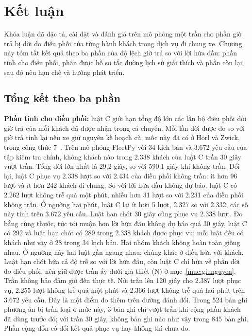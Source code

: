 \chapter{Kết luận}
\label{chuong:ketluan}

Khóa luận đã đặc tả, cài đặt và đánh giá trên mô phỏng một trần cho phần giờ trả bị dời do điều phối của từng hành khách trong dịch vụ đi chung xe. Chương này tóm tắt kết quả theo ba phần của độ lệch giờ trả so với lời hứa đầu: phần tính cho điều phối, phần được hồ sơ tắc đường lịch sử giải thích và phần còn lại; sau đó nêu hạn chế và hướng phát triển.

\section{Tổng kết theo ba phần}
\label{muc:c5-tongket}

\textbf{Phần tính cho điều phối:} luật C giới hạn tổng độ lớn các lần bộ điều phối dời giờ trả của mỗi khách đã được nhận trong cả chuyến. Mỗi lần dời được đo so với giờ trả tính lại nếu xe giữ nguyên kế hoạch cũ; mốc này đã có ở Hörl và Zwick, trong công thức 7~\cite{horl2022}. Trên mô phỏng FleetPy với 34 kịch bản và 3.672 yêu cầu của tập kiểm tra chính, không khách nào trong 2.338 khách của luật C trần 30 giây vượt trần. Tổng dời lớn nhất là 29,2 giây, so với 590,1 giây khi không trần. Đổi lại, luật C phục vụ 2.338 lượt so với 2.434 của điều phối không trần: ít hơn 96 lượt và ít hơn 242 khách đi chung. So với lời hứa đầu không dự báo, luật C có 2.262 lượt không trễ quá một phút, nhiều hơn 31 lượt so với 2.231 của điều phối không trần. Ở ngưỡng hai phút, luật C lại ít hơn 5 lượt, 2.327 so với 2.332; các số này tính trên 3.672 yêu cầu. Luật hạn chót 30 giây cũng phục vụ 2.338 lượt. Đo bằng cùng thước, tức tới muộn hơn lời hứa đầu không dự báo quá 30 giây, luật C có 292 và luật hạn chót có 289 trong 2.338 khách được phục vụ; mỗi luật đều có khách như vậy ở 28 trong 34 kịch bản. Hai nhóm khách không hoàn toàn giống nhau. Ở ngưỡng này hai luật gần ngang nhau; chúng khác ở điều hứa với khách. Luật hạn chót hứa cả độ trễ so với lời hứa đầu, còn luật C chỉ hứa về phần dời do điều phối, nên giữ được trần ấy dưới giả thiết (N) ở mục~\ref{muc:giunguyen}. Trần không bảo đảm giờ đến thực tế. Nới trần lên 120 giây cho 2.387 lượt phục vụ, 2.255 lượt không trễ quá một phút và 2.366 lượt không trễ quá hai phút trên 3.672 yêu cầu. Đây là một điểm đo thêm trên đường đánh đổi. Trong 524 bản ghi phương án bị trần loại ở mức này, 3 bản ghi chỉ vượt trần khi cộng phần khách đã dùng trước đó; với trần 30 giây, không bản ghi nào như vậy trong 845 bản ghi. Phần cộng dồn có đổi kết quả phục vụ hay không thì chưa đo.

